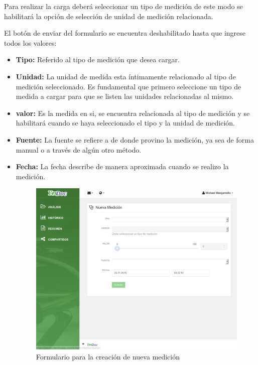 Para realizar la carga deberá seleccionar un tipo de medición de este modo se habilitará la opción de selección de unidad de medición relacionada.

El botón de enviar del formulario se encuentra deshabilitado hasta que ingrese todos los valores:

\begin{itemize}
		\item \textbf{Tipo: } Referido al tipo de medición que desea cargar.
		
			\item \textbf{Unidad: } La unidad de medida esta íntimamente relacionado al tipo de medición seleccionado. Es fundamental que primero seleccione un tipo de medida a cargar para que se listen las unidades relacionadas al mismo.
			
	\item \textbf{valor:} Es la medida en si, se encuentra relacionada al tipo de medición y se habilitará cuando se haya seleccionado el tipo y la unidad de medición.
	\item \textbf{Fuente:} La fuente se refiere a de donde provino la medición, ya sea de forma manual o a través de algún otro método.
	\item \textbf{Fecha:} La fecha describe de manera aproximada cuando se realizo la medición.
    \begin{figure}
    	\centering
    	\includegraphics[width=.8\textwidth]{img/manual_de_usuario/nueva_medicion}
    	\caption{Formulario para la creación de nueva medición}
    	\label{mu-nueva_medicion}
    \end{figure}
    

\end{itemize}
